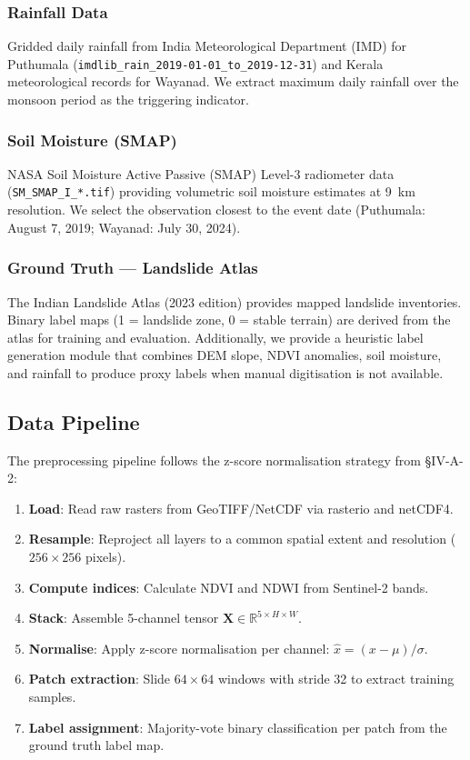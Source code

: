 \documentclass[conference]{IEEEtran}
\begin{document}
\subsubsection{Rainfall Data}
Gridded daily rainfall from India Meteorological Department (IMD) for Puthumala (\texttt{imdlib\_rain\_2019-01-01\_to\_2019-12-31}) and Kerala meteorological records for Wayanad. We extract maximum daily rainfall over the monsoon period as the triggering indicator.

\subsubsection{Soil Moisture (SMAP)}
NASA Soil Moisture Active Passive (SMAP) Level-3 radiometer data (\texttt{SM\_SMAP\_I\_*.tif}) providing volumetric soil moisture estimates at 9~km resolution. We select the observation closest to the event date (Puthumala: August 7, 2019; Wayanad: July 30, 2024).

\subsubsection{Ground Truth — Landslide Atlas}
The Indian Landslide Atlas (2023 edition) provides mapped landslide inventories. Binary label maps (1 = landslide zone, 0 = stable terrain) are derived from the atlas for training and evaluation. Additionally, we provide a heuristic label generation module that combines DEM slope, NDVI anomalies, soil moisture, and rainfall to produce proxy labels when manual digitisation is not available.

\subsection{Data Pipeline}

The preprocessing pipeline follows the z-score normalisation strategy from \cite{eegmoe2026} \S IV-A-2:

\begin{enumerate}
    \item \textbf{Load}: Read raw rasters from GeoTIFF/NetCDF via rasterio and netCDF4.
    \item \textbf{Resample}: Reproject all layers to a common spatial extent and resolution ($256 \times 256$ pixels).
    \item \textbf{Compute indices}: Calculate NDVI and NDWI from Sentinel-2 bands.
    \item \textbf{Stack}: Assemble 5-channel tensor $\mathbf{X} \in \mathbb{R}^{5 \times H \times W}$.
    \item \textbf{Normalise}: Apply z-score normalisation per channel: $\hat{x} = (x - \mu) / \sigma$.
    \item \textbf{Patch extraction}: Slide $64 \times 64$ windows with stride 32 to extract training samples.
    \item \textbf{Label assignment}: Majority-vote binary classification per patch from the ground truth label map.
\end{enumerate}
\end{document}
